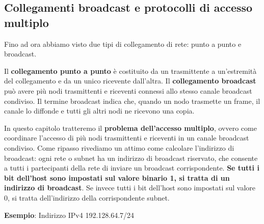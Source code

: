 \documentclass[11pt,a4paper]{article}
\begin{document}
\subsection{Collegamenti broadcast e protocolli di accesso multiplo} \label{par: accesso multiplo}
Fino ad ora abbiamo visto due tipi di collegamento di rete: punto a punto e broadcast.

Il \textbf{collegamento punto a punto} è costituito da un trasmittente a un'estremità del collegamento e da un unico ricevente dall'altra. Il \textbf{collegamento broadcast} può avere più nodi trasmittenti e riceventi connessi allo stesso canale broadcast condiviso.  Il termine broadcast indica che, quando un nodo trasmette un frame, il canale lo diffonde e tutti gli altri nodi ne ricevono una copia.

In questo capitolo tratteremo il \textbf{problema dell'accesso multiplo}, ovvero come coordinare l'accesso di più nodi trasmittenti e riceventi in un canale broadcast condiviso. Come ripasso rivediamo un attimo come calcolare l'indirizzo di broadcast: ogni rete o subnet ha un indirizzo di broadcast riservato, che consente a tutti i partecipanti della rete di inviare un broadcast corrispondente. \textbf{Se tutti i bit dell'host sono impostati sul valore binario 1, si tratta di un indirizzo di broadcast}. Se invece tutti i bit dell'host sono impostati sul valore 0, si tratta dell'indirizzo della corrispondente subnet. \label{pag: 001} 

\textbf{Esempio}: Indirizzo IPv4 192.128.64.7/24
\end{document}
